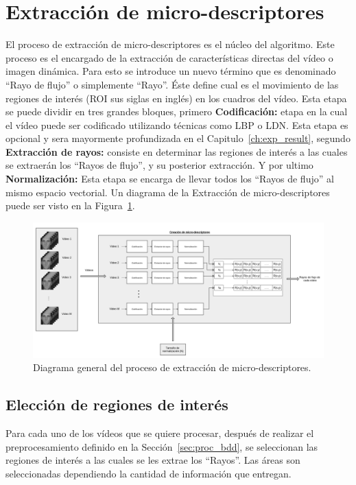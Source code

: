 \section{Extracción de micro-descriptores}
\label{sec:micro-descriptores}
		El proceso de extracción de micro-descriptores es el núcleo del algoritmo. Este proceso es el encargado de la extracción de características directas del vídeo o imagen dinámica. Para esto se introduce un nuevo término que es denominado ``Rayo de flujo'' o simplemente ``Rayo''. Éste define cual es el movimiento de las regiones de interés (ROI sus siglas en inglés) en los cuadros del vídeo. Esta etapa se puede dividir en tres grandes bloques, primero \textbf{Codificación:} etapa en la cual el vídeo puede ser codificado utilizando técnicas como LBP o LDN. Esta etapa es opcional y sera mayormente profundizada en el Capitulo~\ref{ch:exp_result}, segundo \textbf{Extracción de rayos:} consiste en determinar las regiones de interés a las cuales se extraerán los ``Rayos de flujo'', y su posterior extracción. Y por ultimo \textbf{Normalización:} Esta etapa se encarga de llevar todos los ``Rayos de flujo'' al mismo espacio vectorial. Un diagrama de la Extracción de micro-descriptores puede ser visto en la Figura~\ref{algoritmo:fig:micro_descriptores}.

	\begin{figure}[tb]
		\centering
    		\includegraphics[width=1\textwidth,angle=90]{Figuras/Diagramas/Extractor_microdescriptores.png}
  		\caption{Diagrama general del proceso de extracción de micro-des\-crip\-to\-res.}
  		\label{algoritmo:fig:micro_descriptores}
	\end{figure}	


	\subsection{Elección de regiones de interés}
	\label{algoritmo:elecc_roi}
	Para cada uno de los vídeos que se quiere procesar, después de realizar el preprocesamiento definido en la Sección~\ref{sec:proc_bdd}, se seleccionan las regiones de interés a las cuales se les extrae los ``Rayos''. Las áreas son seleccionadas dependiendo la cantidad de información que entregan. 
	
